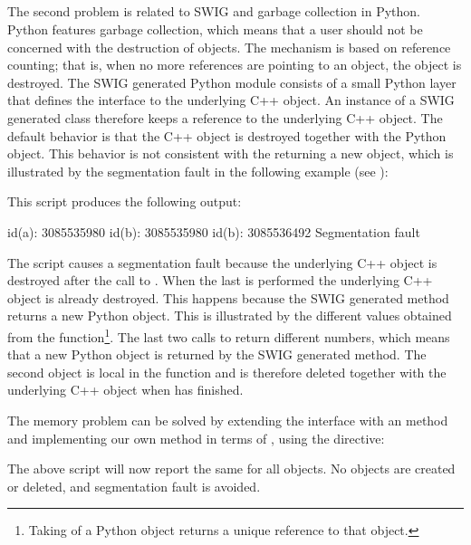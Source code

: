 \subsection{}
The second problem is related to SWIG and garbage collection in Python.
Python features garbage collection, which means that a user should not be
concerned with the destruction of objects. The mechanism is based on
reference counting; that is, when no more references are pointing to an
object, the object is destroyed. The SWIG generated Python module consists
of a small Python layer that defines the interface to the underlying C++
object. An instance of a SWIG generated class therefore keeps a reference
to the underlying C++ object. The default behavior is that the C++ object is destroyed together 
with the Python object. This behavior is not consistent with the
 returning a new object, which is illustrated 
by the segmentation fault in the following example 
(see ):

This script produces the following output:
\begin{python}
id(a): 3085535980
id(b): 3085535980
id(b): 3085536492
Segmentation fault
\end{python}
The script causes a segmentation fault because the underlying C++ object is
destroyed after the call to . When the last  is
performed the underlying C++ object is already destroyed. This happens
because the SWIG generated  method returns a new Python
object. This is illustrated by the different values obtained from the
 function\footnote{Taking  of a Python object returns a
unique reference to that object.}. The last two calls to 
return different numbers, which means that a new Python object is
returned by the SWIG generated  method. The second
 object is local in the  function and 
is therefore deleted together with the underlying C++ object when  has finished.  

The memory problem can be solved by extending the interface with
an  method and implementing our own  method in
terms of , using the  directive:
The above script will now report the same  for all objects. 
No objects are created or deleted, and segmentation fault is avoided.


